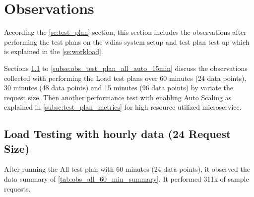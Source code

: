 \section{Observations}

According the \ref{se:test_plan} section, this section includes the observations after performing the test plans on the \acrshort{wdias} system setup and test plan test up which is explained in the \ref{se:workload}.

Sections \ref{subse:obs_test_plan_all_60min} to \ref{subse:obs_test_plan_all_auto_15min} discuss the observations collected with performing the Load test plans over 60 minutes (24 data points), 30 minutes (48 data points) and 15 minutes (96 data points) by variate the request size. Then another performance test with enabling Auto Scaling as explained in \ref{subse:test_plan_metrics} for high resource utilized microservice.

\subsection{Load Testing with hourly data (24 Request Size)}
\label{subse:obs_test_plan_all_60min}

After running the All test plan with 60 minutes (24 data points), it observed the data summary of \ref{tab:obs_all_60_min_summary}. It performed 311k of sample requests.

